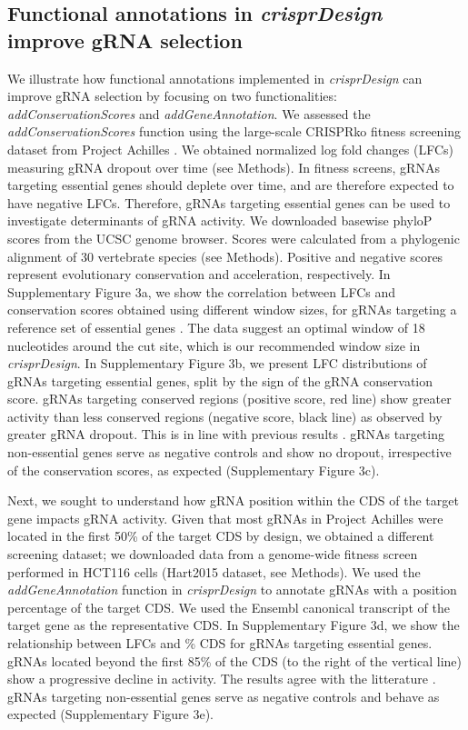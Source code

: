 \documentclass[pdftex,english,10pt]{article}
\begin{document}
\subsection*{Functional annotations in \textit{crisprDesign} improve gRNA selection}

We illustrate how functional annotations implemented in \textit{crisprDesign} can improve gRNA selection by focusing on two functionalities: \textit{addConservationScores} and \textit{addGeneAnnotation}. We assessed the \textit{addConservationScores} function using the large-scale CRISPRko fitness screening dataset from Project Achilles \citep{ceres}. We obtained normalized log fold changes (LFCs) measuring gRNA dropout over time (see Methods). In fitness screens, gRNAs targeting essential genes should deplete over time, and are therefore expected to have negative LFCs. Therefore, gRNAs targeting essential genes can be used to investigate determinants of gRNA activity. We downloaded basewise phyloP scores \citep{pollard2010detection} from the UCSC genome browser. Scores were calculated from a phylogenic alignment of 30 vertebrate species (see Methods). Positive and negative scores represent evolutionary conservation and acceleration, respectively.  In Supplementary Figure 3a, we show the correlation between LFCs and conservation scores obtained using different window sizes, for gRNAs targeting a reference set of essential genes \citep{hart2014}. The data suggest an optimal window of 18 nucleotides around the cut site, which is our recommended window size in \textit{crisprDesign}. In Supplementary Figure 3b, we present LFC distributions of gRNAs targeting essential genes, split by the sign of the gRNA conservation score. gRNAs targeting conserved regions (positive score, red line) show greater activity than less conserved regions (negative score, black line) as observed by greater gRNA dropout. This is in line with previous results \citep{crispro,ruleset3,pincer}. gRNAs targeting non-essential genes serve as negative controls and show no dropout, irrespective of the conservation scores, as expected (Supplementary Figure 3c). 

Next, we sought to understand how gRNA position within the CDS of the target gene impacts gRNA activity. Given that most gRNAs in Project Achilles were located in the first 50\% of the target CDS by design, we obtained a different screening dataset; we downloaded data from a genome-wide fitness screen performed in HCT116 cells (Hart2015 dataset, see Methods). We used the \textit{addGeneAnnotation} function in \textit{crisprDesign} to annotate gRNAs with a position percentage of the target CDS. We used the Ensembl canonical transcript of the target gene as the representative CDS. In Supplementary Figure 3d, we show the relationship between LFCs and \% CDS for gRNAs targeting essential genes. gRNAs located beyond the first 85\% of the CDS (to the right of the vertical line) show a progressive decline in activity. The results agree with the litterature \citep{azimuth}. gRNAs targeting non-essential genes serve as negative controls and behave as expected (Supplementary Figure 3e). 
\end{document}
